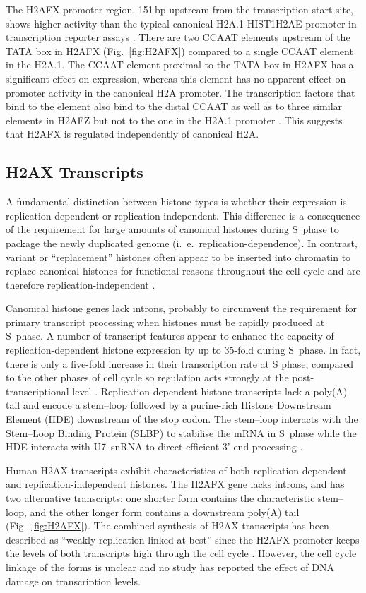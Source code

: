 \documentclass[graybox]{svmult}
\begin{document}
The H2AFX promoter region, 151\,bp upstream from the transcription start site, shows higher activity
than the typical canonical H2A.1 HIST1H2AE promoter in transcription reporter assays \cite{VSI94}.
There are two CCAAT elements upstream of the TATA box in H2AFX (Fig.~\ref{fig:H2AFX}) compared to a
single CCAAT element in the H2A.1. The CCAAT element proximal to the TATA box in H2AFX has a
significant effect on expression, whereas this element has no apparent effect on promoter activity
in the canonical H2A promoter. The transcription factors that bind to the element also bind to the
distal CCAAT as well as to three similar elements in H2AFZ but not to the one in the H2A.1 promoter \cite{VSI94}.
This suggests that H2AFX is regulated independently of canonical H2A.

\subsection{H2AX Transcripts}
\label{subsec:H2AX-transcripts}
A fundamental distinction between histone types is whether their expression is replication-dependent
or replication-independent. This difference is a consequence of the requirement for large amounts of
canonical histones during S~phase to package the newly duplicated genome (i.~e.\ replication-dependence).
In contrast, variant or ``replacement'' histones often appear to be inserted into chromatin to replace
canonical histones for functional reasons throughout the cell cycle and are therefore replication-independent \cite{WFM+02}.

Canonical histone genes lack introns, probably to circumvent the requirement for primary transcript
processing when histones must be rapidly produced at S~phase. A number of transcript features appear
to enhance the capacity of replication-dependent histone expression by up to 35-fold during S~phase.
In fact, there is only a five-fold increase in their transcription rate at S phase, compared to the
other phases of cell cycle so regulation acts strongly at the post-transcriptional level \cite{MEH+91}.
Replication-dependent histone transcripts lack a poly(A) tail and encode a stem--loop followed by a
purine-rich Histone Downstream Element (HDE) downstream of the stop codon. The stem--loop interacts
with the Stem--Loop Binding Protein (SLBP) to stabilise the mRNA in S~phase \cite{MLW+00} while the
HDE interacts with U7~snRNA to direct  efficient 3' end processing \cite{GB85}.

Human H2AX transcripts exhibit characteristics of both replication-dependent and replication-independent
histones. The H2AFX gene lacks introns, and has two alternative transcripts: one shorter form contains
the characteristic stem--loop, and the other longer form contains a downstream poly(A) tail \cite{CMWMB89}
(Fig.~\ref{fig:H2AFX}). The combined synthesis of H2AX transcripts has been described as ``weakly
replication-linked at best'' since the H2AFX promoter keeps the levels of both transcripts high
through the cell cycle \cite{VSI94}. However, the cell cycle linkage of the forms is unclear and no
study has reported the effect of DNA damage on transcription levels.
\end{document}

